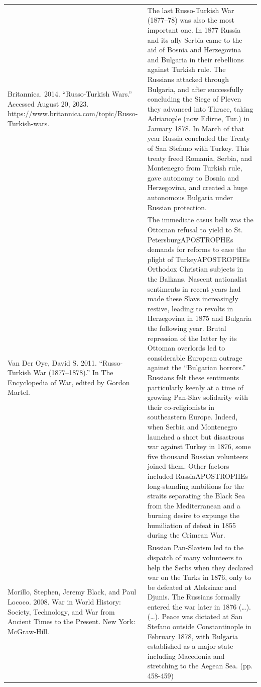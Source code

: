 {\begin{longtable}{p{}p{}}
Britannica. 2014. “Russo-Turkish Wars.” Accessed August 20, 2023. https://www.britannica.com/topic/Russo-Turkish-wars. & The last Russo-Turkish War (1877–78) was also the most important one. In 1877 Russia and its ally Serbia came to the aid of Bosnia and Herzegovina and Bulgaria in their rebellions against Turkish rule. The Russians attacked through Bulgaria, and after successfully concluding the Siege of Pleven they advanced into Thrace, taking Adrianople (now Edirne, Tur.) in January 1878. In March of that year Russia concluded the Treaty of San Stefano with Turkey. This treaty freed Romania, Serbia, and Montenegro from Turkish rule, gave autonomy to Bosnia and Herzegovina, and created a huge autonomous Bulgaria under Russian protection.
\\
Van Der Oye, David S. 2011. “Russo-Turkish War (1877–1878).” In The Encyclopedia of War, edited by Gordon Martel. & The immediate casus belli was the Ottoman refusal to yield to St. PetersburgAPOSTROPHEs demands for reforms to ease the plight of TurkeyAPOSTROPHEs Orthodox Christian subjects in the Balkans. Nascent nationalist sentiments in recent years had made these Slavs increasingly restive, leading to revolts in Herzegovina in 1875 and Bulgaria the following year. Brutal repression of the latter by its Ottoman overlords led to considerable European outrage against the “Bulgarian horrors.” Russians felt these sentiments particularly keenly at a time of growing Pan-Slav solidarity with their co-religionists in southeastern Europe. Indeed, when Serbia and Montenegro launched a short but disastrous war against Turkey in 1876, some five thousand Russian volunteers joined them. Other factors included RussiaAPOSTROPHEs long-standing ambitions for the straits separating the Black Sea from the Mediterranean and a burning desire to expunge the humiliation of defeat in 1855 during the Crimean War.
\\
Morillo, Stephen, Jeremy Black, and Paul Lococo. 2008. War in World History: Society, Technology, and War from Ancient Times to the Present. New York: McGraw-Hill. & Russian Pan-Slavism led to the dispatch of many volunteers to help the Serbs when they declared war on the Turks in 1876, only to be defeated at Aleksinac and Djunis. The Russians formally entered the war later in 1876 (…). (…). Peace was dictated at San Stefano outside Constantinople in February 1878, with Bulgaria established as a major state including Macedonia and stretching to the Aegean Sea. (pp. 458-459)
\\

\end{longtable}}
